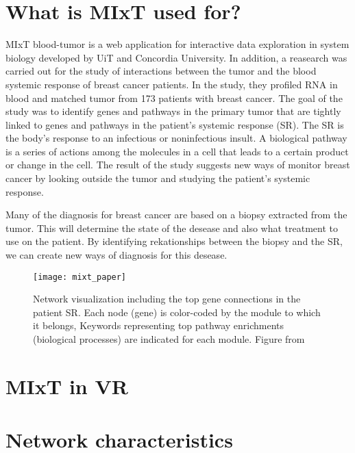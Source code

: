 
\section{What is MIxT used for?}
MIxT blood-tumor is a web application for interactive data exploration in system biology developed by UiT and Concordia University\cite{fjukstad_dumeaux_olsen_lund_hallett_bongo_2017}. In addition, a reasearch was carried out for the study of interactions between the tumor and the blood systemic response of breast cancer patients\cite{dumeaux_fjukstad_interactions_tumor_blood}. In the study, they profiled RNA in blood and matched tumor from 173 patients with breast cancer. The goal of the study was to identify genes and pathways in the primary tumor that are tightly linked to genes and pathways in the patient's systemic response (SR). The SR is the body's response to an infectious or noninfectious insult. A biological pathway is a series of actions among the molecules in a cell that leads to a certain product or change in the cell. The result of the study suggests new ways of monitor breast cancer by looking outside the tumor and studying the patient's systemic response.

Many of the diagnosis for breast cancer are based on a biopsy extracted from the tumor. This will determine the state of the desease and also what treatment to use on the patient. By identifying rekationships between the biopsy and the SR, we can create new ways of diagnosis for this desease.

\begin{figure}[h!]
    \setlength{\tempheight}{15ex}
    \centering
    \texttt{[image: mixt\_paper]}
    \caption{Network visualization including the top gene connections in the patient SR. Each node (gene) is color-coded by the module to which it belongs, Keywords representing top pathway enrichments (biological processes) are indicated for each module. Figure from \cite{dumeaux_fjukstad_interactions_tumor_blood}}
    \label{fig:mixt_paper}
\end{figure}

\section{MIxT in VR}

\section{Network characteristics}
